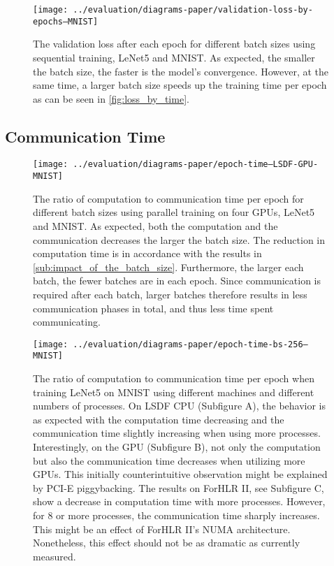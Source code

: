 \documentclass[conference,compsoc,a4paper]{IEEEtran}
\begin{document}
\begin{figure}[h]
\centering
\texttt{[image: ../evaluation/diagrams-paper/validation-loss-by-epochs--MNIST]}
\caption{The validation loss after each epoch for different batch sizes using sequential training, LeNet5 and MNIST.
As expected, the smaller the batch size, the faster is the model's convergence.
However, at the same time, a larger batch size speeds up the training time per epoch as can be seen in \autoref{fig:loss_by_time}.}
\label{fig:loss_by_epoch}
\end{figure}


\subsection{Communication Time} %
\label{sub:communication_time}

\begin{figure}[h]
\centering
\texttt{[image: ../evaluation/diagrams-paper/epoch-time--LSDF-GPU-MNIST]}
\caption{The ratio of computation to communication time per epoch for different batch sizes using parallel training on four GPUs, LeNet5 and MNIST.
As expected, both the computation and the communication decreases the larger the batch size.
The reduction in computation time is in accordance with the results in \autoref{sub:impact_of_the_batch_size}.
Furthermore, the larger each batch, the fewer batches are in each epoch.
Since communication is required after each batch, larger batches therefore results in less communication phases in total, and thus less time spent communicating.}
\label{fig:comm_time_by_batch_size}
\end{figure}

\begin{figure*}[!t]
  \normalsize
  \centering
  \texttt{[image: ../evaluation/diagrams-paper/epoch-time-bs-256--MNIST]}
  \caption{The ratio of computation to communication time per epoch when training LeNet5 on MNIST using different machines and different numbers of processes.
  On LSDF CPU (Subfigure A), the behavior is as expected with the computation time decreasing and the communication time slightly increasing when using more processes.
  Interestingly, on the GPU (Subfigure B), not only the computation but also the communication time decreases when utilizing more GPUs.
  This initially counterintuitive observation might be explained by PCI-E piggybacking.
  The results on ForHLR II, see Subfigure C, show a decrease in computation time with more processes.
  However, for 8 or more processes, the communication time sharply increases.
  This might be an effect of ForHLR II's NUMA architecture.
  Nonetheless, this effect should not be as dramatic as currently measured.
  }
  \label{fig:comm_time_by_machine}
  \vspace*{4pt}
  \hrulefill
\end{figure*}
\end{document}

